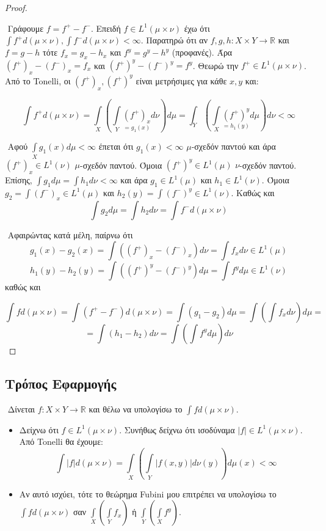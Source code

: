 \begin{proof} $ $

    $ $\newline
    Γράφουμε $f = f^+ - f^-$. Επειδή $f \in L^1 (\mu \times \nu)$ έχω ότι $\int f^+ d(\mu \times \nu), \int f^- d(\mu \times \nu) < \infty$. Παρατηρώ ότι αν $f,g,h : X\times Y \rightarrow \mathbb R$ και $f = g-h$ τότε $f_x = g_x - h_x$ και $f^y = g^y - h^y$ (προφανές). Άρα $(f^+)_x - (f^-)_x = f_x$ και $(f^+)^y - (f^-)^y = f^y$. Θεωρώ την $f^+ \in L^1 (\mu \times \nu)$. Από το {\eng Tonelli}, οι $(f^+)_x, (f^+)^y$ είναι μετρήσιμες για κάθε $x,y$ και:
    
    $$ \int f^+ d(\mu \times \nu) = \int\limits_X \left( \int\limits_Y \underset{= g_1(x)}{(f^+)_x} d\nu \right) d\mu = \int_Y \left( \int\limits_X \underset{=h_1(y)}{(f^+)^y} d\mu \right)  d\nu < \infty$$

    $ $\newline
    Αφού $\int\limits_X g_1(x) d\mu < \infty$ έπεται ότι $g_1(x) < \infty$ $\mu$-σχεδόν παντού και άρα $(f^+)_x \in L^1 (\nu)$ $\mu$-σχεδόν παντού. Όμοια $(f^+)^y \in L^1 (\mu)$ $\nu$-σχεδόν παντού. Επίσης, $\int g_1 d\mu = \int h_1 d\nu < \infty$ και άρα $g_1 \in L^1(\mu)$ και $h_1 \in L^1(\nu)$. Όμοια $g_2 = \int (f^-)_x \in L^1(\mu)$ και $h_2(y) = \int (f^-)^y \in L^1 (\nu)$. Καθώς και 
    $$\int g_2 d\mu = \int h_2 d\nu = \int f^- d(\mu\times \nu)$$

    $ $\newline
    Αφαιρώντας κατά μέλη, παίρνω ότι 
    $$g_1(x) - g_2(x) = \int \left((f^+)_x - (f^-)_x  \right) d\nu = \int f_x d\nu \in L^1(\mu)$$
    $$h_1(y) - h_2(y) = \int \left((f^+)^y - (f^-)^y \right) d\mu = \int f^y d\mu \in L^1(\nu)$$ καθώς και 

    $$ \int f d(\mu \times \nu) = \int \left(f^+ - f^-\right) d(\mu \times \nu) = \int (g_1 - g_2) d\mu = \int \left(\int f_x d\nu\right) d\mu = $$
    $$ = \int (h_1 - h_2)d\nu  = \int \left( \int f^y d\mu \right) d\nu$$
\end{proof}

\subsection{Τρόπος Εφαρμογής}

$ $\newline
Δίνεται $f :X \times Y \rightarrow \mathbb R$ και θέλω να υπολογίσω το $\int fd(\mu \times \nu)$.
\begin{itemize}
    \item Δείχνω ότι $f \in L^1 (\mu \times \nu)$. Συνήθως δείχνω ότι ισοδύναμα $|f| \in L^1 (\mu \times \nu)$. Από {\eng Tonelli} θα έχουμε:
    $$ \int |f| d(\mu \times \nu) = \int\limits_X \left( \int\limits_Y |f(x,y)| d\nu(y)\right) d\mu(x) < \infty $$

    \item Αν αυτό ισχύει, τότε το θεώρημα {\eng Fubini} μου επιτρέπει να υπολογίσω το $\int f d(\mu \times \nu)$ σαν $\int\limits_X \left(\int\limits_Y f_x \right)$ ή $\int\limits_{Y} \left(\int\limits_X f^y \right)$.
    
\end{itemize}

